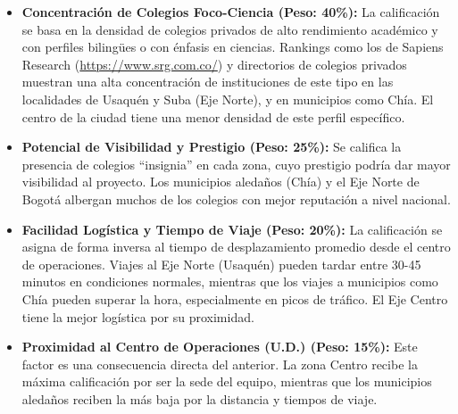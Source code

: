 \begin{itemize}
  \item \textbf{Concentración de Colegios Foco-Ciencia (Peso: 40\%):} La
    calificación se basa en la densidad de colegios privados de alto rendimiento
    académico y con perfiles bilingües o con énfasis en ciencias. Rankings como
    los de Sapiens Research (\url{https://www.srg.com.co/}) y directorios de
    colegios privados muestran una alta concentración de instituciones de este
    tipo en las localidades de Usaquén y Suba (Eje Norte), y en municipios como
    Chía. El centro de la ciudad tiene una menor densidad de este perfil
    específico.

  \item \textbf{Potencial de Visibilidad y Prestigio (Peso: 25\%):} Se califica
    la presencia de colegios ``insignia'' en cada zona, cuyo prestigio podría
    dar mayor visibilidad al proyecto. Los municipios aledaños (Chía) y el Eje
    Norte de Bogotá albergan muchos de los colegios con mejor reputación a nivel
    nacional.

  \item \textbf{Facilidad Logística y Tiempo de Viaje (Peso: 20\%):} La
    calificación se asigna de forma inversa al tiempo de desplazamiento promedio
    desde el centro de operaciones. Viajes al Eje Norte (Usaquén) pueden tardar
    entre 30-45 minutos en condiciones normales, mientras que los viajes a
    municipios como Chía pueden superar la hora, especialmente en picos de
    tráfico. El Eje Centro tiene la mejor logística por su proximidad.

  \item \textbf{Proximidad al Centro de Operaciones (U.D.) (Peso: 15\%):} Este
    factor es una consecuencia directa del anterior. La zona Centro recibe la
    máxima calificación por ser la sede del equipo, mientras que los municipios
    aledaños reciben la más baja por la distancia y tiempos de viaje.
\end{itemize}

